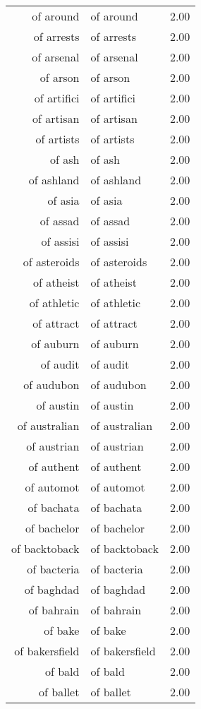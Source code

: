 \begin{table}[ht]
\begin{tabular}{rlr}
  of around & of around & 2.00 \\ 
  of arrests & of arrests & 2.00 \\ 
  of arsenal & of arsenal & 2.00 \\ 
  of arson & of arson & 2.00 \\ 
  of artifici & of artifici & 2.00 \\ 
  of artisan & of artisan & 2.00 \\ 
  of artists & of artists & 2.00 \\ 
  of ash & of ash & 2.00 \\ 
  of ashland & of ashland & 2.00 \\ 
  of asia & of asia & 2.00 \\ 
  of assad & of assad & 2.00 \\ 
  of assisi & of assisi & 2.00 \\ 
  of asteroids & of asteroids & 2.00 \\ 
  of atheist & of atheist & 2.00 \\ 
  of athletic & of athletic & 2.00 \\ 
  of attract & of attract & 2.00 \\ 
  of auburn & of auburn & 2.00 \\ 
  of audit & of audit & 2.00 \\ 
  of audubon & of audubon & 2.00 \\ 
  of austin & of austin & 2.00 \\ 
  of australian & of australian & 2.00 \\ 
  of austrian & of austrian & 2.00 \\ 
  of authent & of authent & 2.00 \\ 
  of automot & of automot & 2.00 \\ 
  of bachata & of bachata & 2.00 \\ 
  of bachelor & of bachelor & 2.00 \\ 
  of backtoback & of backtoback & 2.00 \\ 
  of bacteria & of bacteria & 2.00 \\ 
  of baghdad & of baghdad & 2.00 \\ 
  of bahrain & of bahrain & 2.00 \\ 
  of bake & of bake & 2.00 \\ 
  of bakersfield & of bakersfield & 2.00 \\ 
  of bald & of bald & 2.00 \\ 
  of ballet & of ballet & 2.00 \\ 

\end{tabular}
\end{table}
